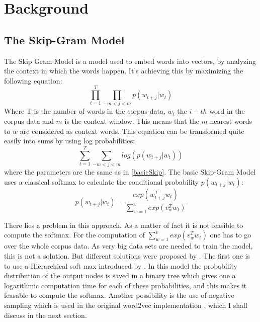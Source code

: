 \chapter{Background}\label{chap:background}

\section{The Skip-Gram Model} 
The Skip Gram Model is a model used to embed words into vectors, by analyzing the context in which the words happen. It's achieving this by maximizing the following equation:\begin{equation} \label{basicSkip} \prod_{t=1}^T \prod_{-m<j<m}  p(w_{t+j}|w_t) \end{equation} Where T is the number of words in the corpus data, $w_i$ the $i-th$ word in the corpus data and $m$ is the context window. This means that the $m$ nearest words to $w$ are considered as context words.
This equation can be transformed quite easily into sums by using log probabilities: 
\begin{equation} \sum _{t=1}^T \sum_{-m<j<m} log( p(w_{t+j}|w_t) )\end{equation} 
    where the parameters are the same as in \ref{basicSkip}. The basic Skip-Gram Model uses a classical softmax to calculate the conditional probability $p(w_{t+j}|w_t)$: 
   \begin{equation}
   p(w_{t+j}|w_t)=  \frac{exp(w_{t+j}^T w_t)}{\sum_{w=1}^v exp(v_w^T w_t)}
   \end{equation}
  
  There lies a problem in this approach. As a matter of fact it is not feasible to compute the softmax. For the computation of $\sum_{w=1}^v exp(v_w^T w_t)$ one has to go over the whole corpus data. As very big data sets are needed to train the model, this is not a solution. But different solutions were proposed by \cite{mikolov2}. The first one is to use a Hierarchical soft max introduced by \cite{hsoftmax}. In this model the probability distribution of the output nodes is saved in a binary tree which gives one a logarithmic computation time for each of these probabilities, and this makes it feasable to compute the softmax. Another possibility is the use of negative sampling which is used in the original word2vec implementation \cite{mikolov2}, which I shall discuss in the next section. 

